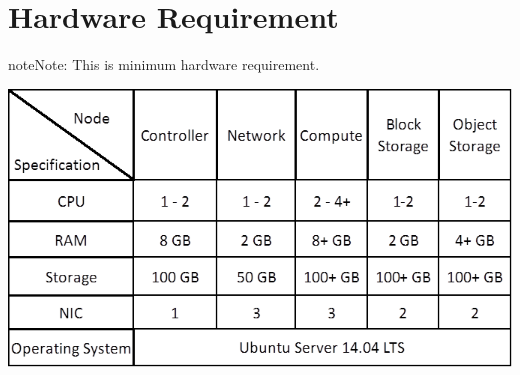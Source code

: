 \documentclass[letterpaper,10pt,english]{sphinxmanual}
\begin{document}
\begin{enumerate}
\end{enumerate}


\section{Hardware Requirement}
\label{_source/installation_guide/hardware_requirement:hardware-requirement}\label{_source/installation_guide/hardware_requirement::doc}
\begin{notice}{note}{Note:}
This is minimum hardware requirement.
\end{notice}

{\hfill\includegraphics{_source/installation_guide/_images/hwrqmnts.png}\hfill}
\end{document}
